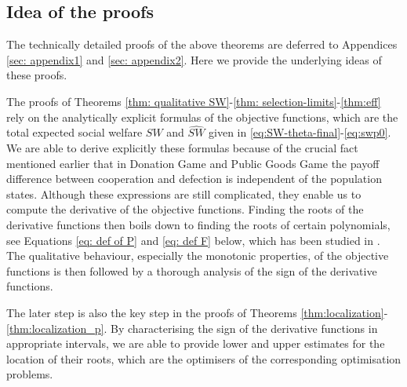 \documentclass{article}
\begin{document}
\subsection*{Idea of the proofs} 
The technically detailed proofs of the above theorems are deferred to Appendices  \ref{sec: appendix1} and \ref{sec: appendix2}. Here we provide the underlying ideas of these proofs.

The proofs of Theorems \ref{thm: qualitative SW}-\ref{thm: selection-limits}-\ref{thm:eff} rely on the analytically explicit formulas of the objective functions, which are the total expected social welfare $SW$ and $\widehat{SW}$ given in \eqref{eq:SW-theta-final}-\eqref{eq:swp0}. We are able to derive explicitly these formulas because of the crucial fact mentioned earlier that in Donation Game and Public Goods Game the payoff difference between cooperation and defection is independent of the population states. Although these expressions are still complicated, they enable us to compute the derivative of the objective functions. Finding the roots of the derivative functions then boils down to finding the roots of certain polynomials, see Equations \eqref{eq: def of P} and \eqref{eq: def F} below, which has been studied in \cite{duonghan2021cost}. The qualitative behaviour, especially the monotonic properties, of the objective functions is then followed by a thorough analysis of the sign of the derivative functions.

The later step is also the key step in the proofs of Theorems \ref{thm:localization}-\ref{thm:localization_p}. By characterising the sign of the derivative functions in appropriate intervals, we are able to provide lower and upper estimates for the location of their roots, which are the optimisers of the corresponding optimisation problems. 
\end{document}
